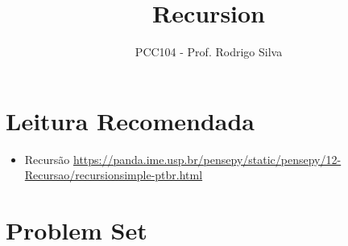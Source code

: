 \documentclass[12pt]{article}
\title{Recursion}
\author{PCC104 - Prof. Rodrigo Silva}
\date{}
\begin{document}
\maketitle
\section*{Leitura Recomendada}

\begin{itemize}
    \item Recursão \url{https://panda.ime.usp.br/pensepy/static/pensepy/12-Recursao/recursionsimple-ptbr.html}
\end{itemize}

\section*{Problem Set}
\end{document}
